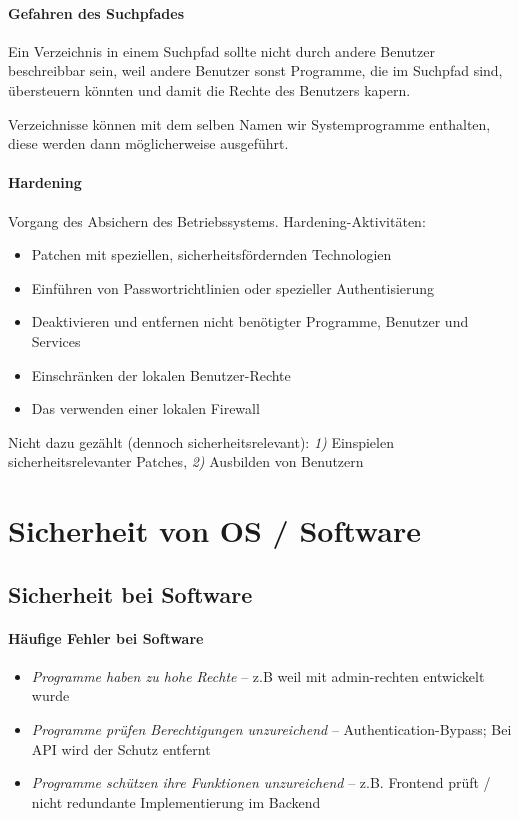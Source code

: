 \documentclass[a4paper,12pt]{article}
\begin{document}
\paragraph{Gefahren des Suchpfades}
Ein Verzeichnis in einem Suchpfad sollte nicht durch andere Benutzer beschreibbar sein, weil andere Benutzer sonst Programme, die im Suchpfad sind, übersteuern könnten und damit die Rechte des Benutzers kapern.

Verzeichnisse können mit dem selben Namen wir Systemprogramme enthalten, diese werden dann möglicherweise ausgeführt.

\paragraph{Hardening}

Vorgang des Absichern des Betriebssystems. Hardening-Aktivitäten:
\begin{itemize}
\item Patchen mit speziellen, sicherheitsfördernden Technologien
\item Einführen von Passwortrichtlinien oder spezieller Authentisierung
\item Deaktivieren und entfernen nicht benötigter Programme, Benutzer und Services
\item Einschränken der lokalen Benutzer-Rechte
\item Das verwenden einer lokalen Firewall
\end{itemize}


Nicht dazu gezählt (dennoch sicherheitsrelevant): \emph{1)} Einspielen sicherheitsrelevanter Patches, \emph{2)} Ausbilden von Benutzern



\newpage
\section{Sicherheit von OS / Software}

\subsection{Sicherheit bei Software}
\paragraph{Häufige Fehler bei Software}
\begin{itemize}
\item \emph{Programme haben zu hohe Rechte} -- z.B weil mit admin-rechten entwickelt wurde
\item \emph{Programme prüfen Berechtigungen unzureichend} -- Authentication-Bypass; Bei API wird der Schutz entfernt
\item \emph{Programme schützen ihre Funktionen unzureichend} -- z.B. Frontend prüft / nicht redundante Implementierung im Backend
\end{itemize}
\end{document}
